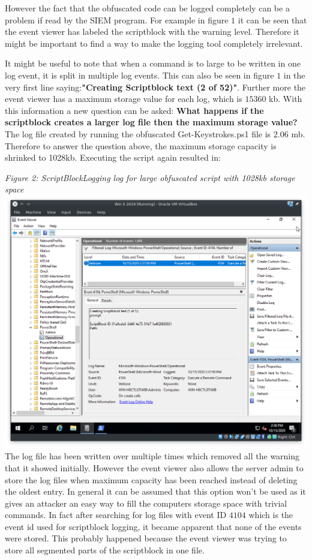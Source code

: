 \documentclass{article}%
\begin{document}
However the fact that the obfuscated code can be logged completely can be a problem if read by the SIEM program. For example in figure $1$ it can be seen that the event viewer has labeled the scriptblock with the warning level. Therefore it might be important to find a way to make the logging tool completely irrelevant.

It might be useful to note that when a command is to large to be written in one log event, it is split in multiple log events. This can also be seen in figure $1$ in the very first line saying:\textbf{"Creating Scriptblock text (2 of 52)"}. Further more the event viewer has a maximum storage value for each log, which is $15360$ kb. With this information a new question can be asked: \textbf{What happens if the scriptblock creates a larger log file then the maximum storage value?} The log file created by running the obfuscated Get-Keystrokes.ps1 file is $2.06$ mb. Therefore to answer the question above, the maximum storage capacity is shrinked to 1028kb. Executing the script again resulted in:\newline\newline

\textit{Figure 2: ScriptBlockLogging log for large obfuscated script with 1028kb storage space}\\
\includegraphics[scale=0.44]{2}
The log file has been written over multiple times which removed all the warning that it showed initially. However the event viewer also allows the server admin to store the log files when maximum capacity has been reached instead of deleting the oldest entry. In general it can be assumed that this option won't be used as it gives an attacker an easy way to fill the computers storage space with trivial commands. In fact after searching for log files with event ID $4104$ which is the event id used for scriptblock logging, it became apparent that none of the events were stored. This probably happened because the event viewer was trying to store all segmented parts of the scriptblock in one file.
\end{document}
